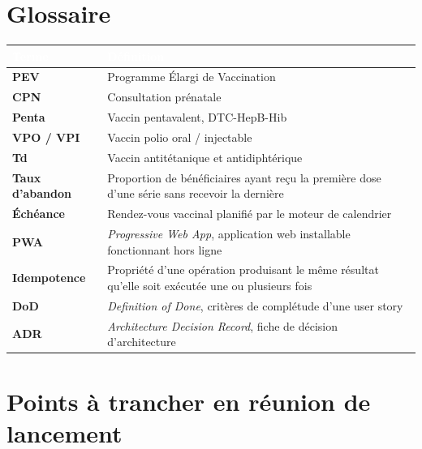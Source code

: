 \documentclass[11pt,a4paper]{article}
\newcommand{\hd}[1]{\textcolor{white}{\sffamily\bfseries\small #1}}
\newcommand{\rowhead}{\rowcolor{primary}}
\begin{document}
\section{Glossaire}

\noindent
\begin{tabularx}{\textwidth}{@{}R{3.4cm} L@{}}
\toprule
\rowhead \hd{Terme} & \hd{Définition} \\
\midrule
\textbf{PEV} & Programme Élargi de Vaccination \\
\textbf{CPN} & Consultation prénatale \\
\textbf{Penta} & Vaccin pentavalent, DTC-HepB-Hib \\
\textbf{VPO / VPI} & Vaccin polio oral / injectable \\
\textbf{Td} & Vaccin antitétanique et antidiphtérique \\
\textbf{Taux d'abandon} & Proportion de bénéficiaires ayant reçu la première dose d'une série sans recevoir la dernière \\
\textbf{Échéance} & Rendez-vous vaccinal planifié par le moteur de calendrier \\
\textbf{PWA} & \textit{Progressive Web App}, application web installable fonctionnant hors ligne \\
\textbf{Idempotence} & Propriété d'une opération produisant le même résultat qu'elle soit exécutée une ou plusieurs fois \\
\textbf{DoD} & \textit{Definition of Done}, critères de complétude d'une user story \\
\textbf{ADR} & \textit{Architecture Decision Record}, fiche de décision d'architecture \\
\bottomrule
\end{tabularx}

\section{Points à trancher en réunion de lancement}
\end{document}
